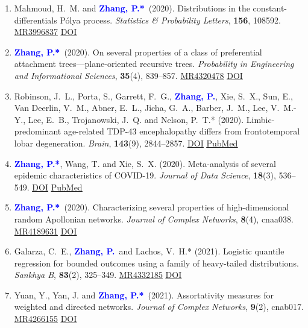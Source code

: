 \documentclass[12pt]{article}
\def\MR#1{\href{http://www.ams.org/mathscinet-getitem?mr=#1}{MR#1}}
\newcommand{\PZ}{\textbf{\textcolor{blue}{Zhang, P.*}}}
\newcommand{\PZnot}{\textbf{\textcolor{blue}{Zhang, P.}}}
\begin{document}
\begin{enumerate}
		\item {\sc Mahmoud, H.\ M.} and \PZ\ (2020). 
		Distributions in the constant-differentials P\'{o}lya process. {\em Statistics \& Probability Letters}, \textbf{156}, 108592. \MR{3996837}
		\href{https://doi.org/10.1016/j.spl.2019.108592}
		{\underline{DOI}}
		
		\item \PZ\ (2020). On several properties of a 
		class of preferential attachment trees---plane-oriented 
		recursive trees. {\em Probability in Engineering and 
		Informational Sciences}, {\bf 35}(4), 839--857. \MR{4320478}
		\href{https://doi.org/10.1017/S0269964820000261}
		{\underline{DOI}}
		
		\item {\sc Robinson, J.\ L., Porta, S., Garrett, F.\ G.}, 
		\PZnot, {\sc Xie, S.\ X., Sun, E., Van Deerlin, V.\ M., Abner, E.\ L., Jicha, G.\ A., Barber, J.\ M., Lee, V.\ M.-Y., Lee, E.\ B., Trojanowski, J.\ Q.} and {\sc Nelson, P.\ T.*} (2020). Limbic-predominant age-related TDP-43 encephalopathy differs from frontotemporal lobar degeneration. {\em Brain}, {\bf 143}(9), 
		2844--2857. \href{https://doi.org/10.1093/brain/awaa219}
		{\underline{DOI}} \href{https://pubmed.ncbi.nlm.nih.gov/32830216}
		{\underline{PubMed}}
		
		\item \PZ, {\sc Wang, T.} and {\sc Xie, S.\ X.} 
		(2020). Meta-analysis of several epidemic characteristics of COVID-19. {\em Journal of Data Science}, {\bf 18}(3), 536--549. \href{https://doi.org/10.6339/JDS.202007_18(3).0019}
		{\underline{DOI}} \href{https://pubmed.ncbi.nlm.nih.gov/33088292}
		{\underline{PubMed}}
		
		\item \PZ\ (2020). Characterizing several properties of 
		high-dimensional random Apollonian networks. {\em 
		Journal of Complex Networks}, {\bf 8}(4), cnaa038. \MR{4189631} \href{https://doi.org/10.1093/comnet/cnaa038}
		{\underline{DOI}}
		
		\item {\sc Galarza, C.\ E.}, \PZnot\	and {\sc Lachos, V.\ H.*} (2021). Logistic quantile regression for bounded outcomes using a family of heavy-tailed distributions. {\em Sankhya B}, {\bf 83}(2), 325--349. \MR{4332185} 
		\href{https://doi.org/10.1007/s13571-020-00231-0}
		{\underline{DOI}}
		
		\item {\sc Yuan, Y., Yan, J.} and \PZ\ (2021). 
		Assortativity measures for weighted and directed
		networks. \emph{Journal of Complex Networks}, {\bf 9}(2), cnab017. \MR{4266155} \href{https://doi.org/10.1093/comnet/cnab017}
		{\underline{DOI}}
		

\end{enumerate}
\end{document}
